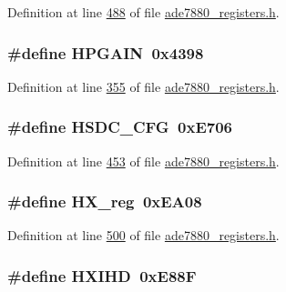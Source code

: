 Definition at line \hyperlink{a00036_source_l00488}{488} of file \hyperlink{a00036_source}{ade7880\-\_\-registers.\-h}.

\hypertarget{a00036_a8ccbfb7b68b73c3cc9aef1886209df0f}{
\subsubsection[{H\-P\-G\-A\-I\-N}]{\setlength{\rightskip}{0pt plus 5cm}\#define H\-P\-G\-A\-I\-N~0x4398}}\label{de/d8c/a00036_a8ccbfb7b68b73c3cc9aef1886209df0f}


Definition at line \hyperlink{a00036_source_l00355}{355} of file \hyperlink{a00036_source}{ade7880\-\_\-registers.\-h}.

\hypertarget{a00036_a1ef9153bd21f7ed65a6471842212e435}{
\subsubsection[{H\-S\-D\-C\-\_\-\-C\-F\-G}]{\setlength{\rightskip}{0pt plus 5cm}\#define H\-S\-D\-C\-\_\-\-C\-F\-G~0x\-E706}}\label{de/d8c/a00036_a1ef9153bd21f7ed65a6471842212e435}


Definition at line \hyperlink{a00036_source_l00453}{453} of file \hyperlink{a00036_source}{ade7880\-\_\-registers.\-h}.

\hypertarget{a00036_a206f6fe198ba53389de628f12ac30886}{
\subsubsection[{H\-X\-\_\-reg}]{\setlength{\rightskip}{0pt plus 5cm}\#define H\-X\-\_\-reg~0x\-E\-A08}}\label{de/d8c/a00036_a206f6fe198ba53389de628f12ac30886}


Definition at line \hyperlink{a00036_source_l00500}{500} of file \hyperlink{a00036_source}{ade7880\-\_\-registers.\-h}.

\hypertarget{a00036_ac22e2f229bd4f7de9a5c26f6fc824b92}{
\subsubsection[{H\-X\-I\-H\-D}]{\setlength{\rightskip}{0pt plus 5cm}\#define H\-X\-I\-H\-D~0x\-E88\-F}}\label{de/d8c/a00036_ac22e2f229bd4f7de9a5c26f6fc824b92}


